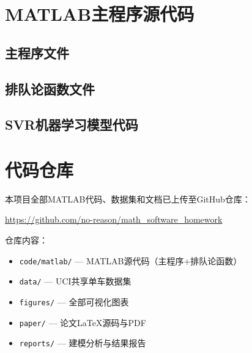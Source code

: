 \documentclass[12pt,a4paper]{article}
\begin{document}
\appendix

\section{MATLAB主程序源代码}

\subsection{主程序文件}



\newpage

\subsection{排队论函数文件}



\newpage

\subsection{SVR机器学习模型代码}


\newpage

\section{代码仓库}

本项目全部MATLAB代码、数据集和文档已上传至GitHub仓库：

\begin{center}
\url{https://github.com/no-reason/math_software_homework}
\end{center}

仓库内容：
\begin{itemize}
  \item \texttt{code/matlab/} — MATLAB源代码（主程序+排队论函数）
  \item \texttt{data/} — UCI共享单车数据集
  \item \texttt{figures/} — 全部可视化图表
  \item \texttt{paper/} — 论文LaTeX源码与PDF
  \item \texttt{reports/} — 建模分析与结果报告
\end{itemize}
\end{document}
